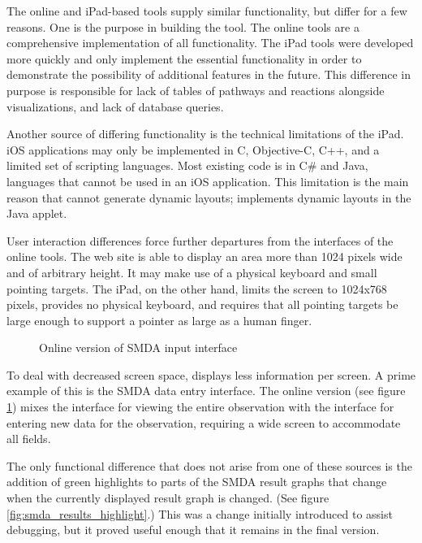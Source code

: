 The online and iPad-based \pathcasemaw tools supply similar functionality, but
differ for a few reasons. One is the purpose in building the tool. The online
tools are a comprehensive implementation of all \pathcasemaw functionality. The
iPad tools were developed more quickly and only implement the essential
functionality in order to demonstrate the possibility of additional features in
the future. This difference in purpose is responsible for \mawappp lack of
tables of pathways and reactions alongside visualizations, and \mawappp lack of
database queries.

Another source of differing functionality is the technical limitations of the
iPad. iOS applications may only be implemented in C, Objective-C, C++, and a
limited set of scripting languages. Most existing \pathcasemaw code is in C\#
and Java, languages that cannot be used in an iOS application. This limitation
is the main reason that \mawapp cannot generate dynamic layouts; \pathcasemaw
implements dynamic layouts in the Java applet.

User interaction differences force further departures from the interfaces of the
online tools. The web site is able to display an area more than 1024 pixels wide
and of arbitrary height. It may make use of a physical keyboard and small
pointing targets. The iPad, on the other hand, limits the screen to 1024x768
pixels, provides no physical keyboard, and requires that all pointing targets
be large enough to support a pointer as large as a human finger.

\begin{figure}[htb]
    \caption{\label{fig:smda_input_online} Online version of SMDA input
    interface}
\end{figure}

To deal with decreased screen space, \mawapp displays less information per
screen. A prime example of this is the SMDA data entry interface. The online
version (see figure \ref{fig:smda_input_online}) mixes the interface for viewing
the entire observation with the interface for entering new data for the
observation, requiring a wide screen to accommodate all fields.

The only functional difference that does not arise from one of these sources is
the addition of green highlights to parts of the SMDA result graphs that change
when the currently displayed result graph is changed. (See figure
\ref{fig:smda_results_highlight}.) This was a change initially introduced to
assist debugging, but it proved useful enough that it remains in the final
version.
